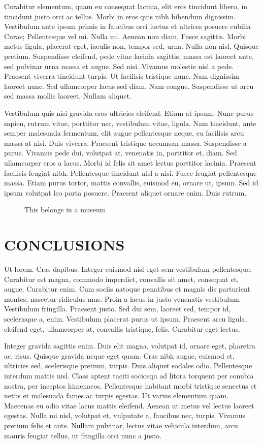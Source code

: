 \documentclass[12pt]{article}
\begin{document}
Curabitur elementum, quam eu consequat lacinia, elit eros tincidunt libero, in tincidunt justo orci ac tellus. Morbi in eros quis nibh bibendum dignissim. Vestibulum ante ipsum primis in faucibus orci luctus et ultrices posuere cubilia Curae; Pellentesque vel mi. Nulla mi. Aenean non diam. Fusce sagittis. Morbi metus ligula, placerat eget, iaculis non, tempor sed, urna. Nulla non nisl. Quisque pretium. Suspendisse eleifend, pede vitae lacinia sagittis, massa est laoreet ante, sed pulvinar urna massa et augue. Sed nisi. Vivamus molestie nisl a pede. Praesent viverra tincidunt turpis. Ut facilisis tristique nunc. Nam dignissim laoreet nunc. Sed ullamcorper lacus sed diam. Nam congue. Suspendisse ut arcu sed massa mollis laoreet. Nullam aliquet.

Vestibulum quis nisi gravida eros ultricies eleifend. Etiam at ipsum. Nunc purus sapien, rutrum vitae, porttitor nec, vestibulum vitae, ligula. Nam tincidunt, ante semper malesuada fermentum, elit augue pellentesque neque, eu facilisis arcu massa at nisi. Duis viverra. Praesent tristique accumsan massa. Suspendisse a purus. Vivamus pede dui, volutpat at, venenatis in, porttitor et, diam. Sed ullamcorper eros a lacus. Morbi id felis sit amet lectus porttitor lacinia. Praesent facilisis feugiat nibh. Pellentesque tincidunt nisl a nisi. Fusce feugiat pellentesque massa. Etiam purus tortor, mattis convallis, euismod eu, ornare ut, ipsum. Sed id ipsum volutpat leo porta posuere. Praesent aliquet ornare enim. Duis rutrum. 

\begin{figure}
\centering
{}
\caption{This belongs in a museum}
\label{museum}
\end{figure}

\section{CONCLUSIONS}
Ut lorem. Cras dapibus. Integer euismod nisl eget sem vestibulum pellentesque. Curabitur est magna, commodo imperdiet, convallis sit amet, consequat et, augue. Curabitur enim. Cum sociis natoque penatibus et magnis dis parturient montes, nascetur ridiculus mus. Proin a lacus in justo venenatis vestibulum. Vestibulum fringilla. Praesent justo. Sed dui sem, laoreet sed, tempor id, scelerisque a, enim. Vestibulum placerat purus ut ipsum. Praesent arcu ligula, eleifend eget, ullamcorper at, convallis tristique, felis. Curabitur eget lectus.

Integer gravida sagittis enim. Duis elit magna, volutpat id, ornare eget, pharetra ac, risus. Quisque gravida neque eget quam. Cras nibh augue, euismod et, ultricies sed, scelerisque pretium, turpis. Duis aliquet sodales odio. Pellentesque interdum mattis nisl. Class aptent taciti sociosqu ad litora torquent per conubia nostra, per inceptos himenaeos. Pellentesque habitant morbi tristique senectus et netus et malesuada fames ac turpis egestas. Ut varius elementum quam. Maecenas eu odio vitae lacus mattis eleifend. Aenean ut metus vel lectus laoreet egestas. Nulla mi nisl, volutpat et, vulputate a, faucibus nec, turpis. Vivamus pretium felis et ante. Nullam pulvinar, lectus vitae vehicula interdum, arcu mauris feugiat tellus, ut fringilla orci nunc a justo. 
\end{document}
